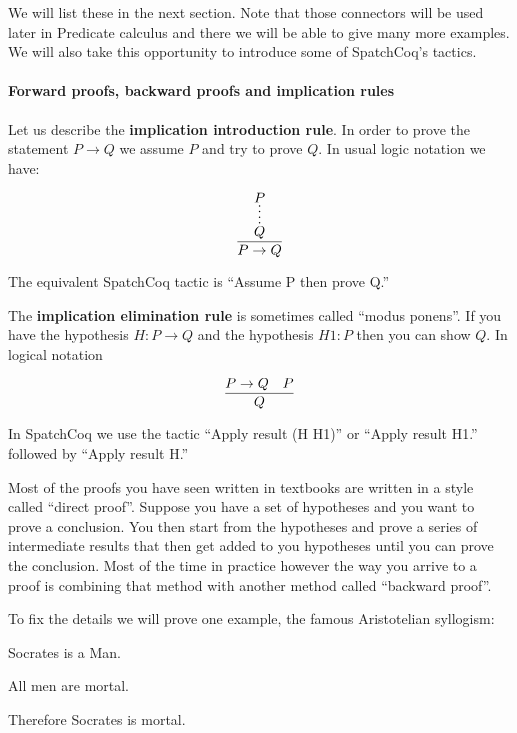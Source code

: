 \begin{itemize}
 
 

 We will list these in the next section. Note that those connectors will be used later in Predicate calculus and there we will be able to give many more examples. We will also take this opportunity to introduce some of SpatchCoq's tactics.

\paragraph{\bf Forward proofs, backward proofs and implication rules}

Let us describe the {\bf implication introduction rule}.  In order to prove the statement $P\rightarrow Q$ we  assume $P$ and try to prove $Q$. In usual logic notation we have:

$$\infer{P\rightarrow Q}{%
    \infer*{Q}{P}
}$$

The equivalent SpatchCoq tactic is ``Assume P then prove Q.''


The {\bf implication elimination rule} is sometimes called ``modus ponens''. If you have the hypothesis $H:P\rightarrow Q$ and the hypothesis $H1:P$ then you can show $Q$. In logical notation

$$\infer{Q}{P\rightarrow Q & P}$$

In SpatchCoq we use the tactic ``Apply result (H H1)'' or ``Apply result H1.'' followed by ``Apply result H.''



Most of the proofs you have seen written in textbooks are written in a style called ``direct proof''. Suppose you have a set of hypotheses and you want to prove a conclusion. You then start from the hypotheses and prove a series of intermediate results that then get added to you hypotheses until you can prove the conclusion. Most of the time in practice however the way you arrive to a proof is  combining that method with another method called ``backward proof''. 

To fix the details we will prove one example, the famous Aristotelian syllogism:

Socrates is a Man.

All men are mortal.

Therefore Socrates is mortal.


\end{itemize}
